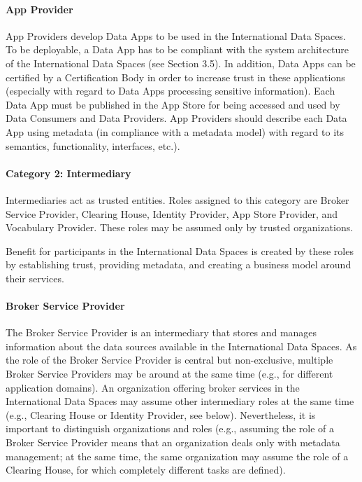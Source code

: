 \paragraph{App Provider} %
App Providers develop Data Apps to be used in the International Data Spaces. To be deployable, a Data App has to be compliant with the system architecture of the International Data Spaces (see Section 3.5). In addition, Data Apps can be certified by a Certification Body in order to increase trust in these applications (especially with regard to Data Apps processing sensitive information). Each Data App must be published in the App Store for being accessed and used by Data Consumers and Data Providers. App Providers should describe each Data App using metadata (in compliance with a metadata model) with regard to its semantics, functionality, interfaces, etc.).


\paragraph{Category 2: Intermediary}
Intermediaries act as trusted entities. Roles assigned to this category are Broker Service Provider, Clearing House, Identity Provider, App Store Provider, and Vocabulary Provider. These roles may be assumed only by trusted organizations. 

Benefit for participants in the International Data Spaces is created by these roles by establishing trust, providing metadata, and creating a business model around their services.

\paragraph{Broker Service Provider}
The Broker Service Provider is an intermediary that stores and manages information about the data sources available in the International Data Spaces. As the role of the Broker Service Provider is central but non-exclusive, multiple Broker Service Providers may be around at the same time (e.g., for different application domains). An organization offering broker services in the International Data Spaces may assume other intermediary roles at the same time (e.g., Clearing House or Identity Provider, see below). Nevertheless, it is important to distinguish organizations and roles (e.g., assuming the role of a Broker Service Provider means that an organization deals only with metadata management; at the same time, the same organization may assume the role of a Clearing House, for which completely different tasks are defined).

